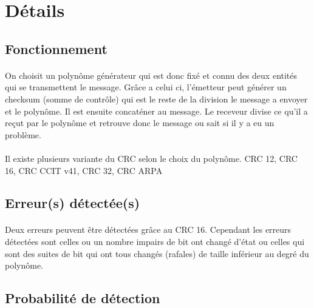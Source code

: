         \section{Détails}

            \subsection{Fonctionnement}

                \paragraph{}
                    On choisit un polynôme générateur qui est donc fixé et connu des deux entités qui se transmettent le message.
                    Grâce a celui ci, l'émetteur peut générer un checksum (somme de contrôle) qui est le reste
                    de la division le message a envoyer et le polynôme. Il est ensuite concaténer au message.
                    Le receveur divise ce qu'il a reçut par le polynôme et retrouve donc le message ou
                    sait si il y a eu un problème.

                \paragraph{}
                    Il existe plusieurs variante du CRC selon le choix du polynôme.
                    CRC 12, CRC 16, CRC CCIT v41, CRC 32, CRC ARPA

            \subsection{Erreur(s) détectée(s)}

                \paragraph{}
                    Deux erreurs peuvent être détectées grâce au CRC 16.
                    Cependant les erreurs détectées sont celles ou un nombre impairs de bit ont changé d'état ou
                    celles qui sont des suites de bit qui ont tous changés (rafales) de taille inférieur au
                    degré du polynôme.

            \subsection{Probabilité de détection}


